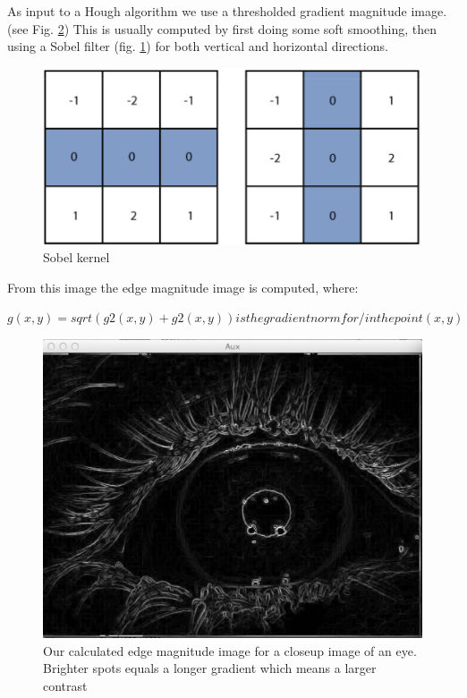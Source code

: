 As input to a Hough algorithm we use a thresholded gradient magnitude
image. (see Fig. \ref{hough3}) This is usually computed by first doing
some soft smoothing, then using a Sobel filter (fig. \ref{hough2}) for
both vertical and horizontal directions.

\begin{figure}[htbp]
\centering
\includegraphics{pics/hough/2.png}
\caption{Sobel kernel \label{hough2}}
\end{figure}

From this image the edge magnitude image is computed, where:

$g(x,y)= sqrt(g2(x,y)+g2(x,y)) is the gradient norm for/in the point (x,y)$

\begin{figure}[htbp]
\centering
\includegraphics{pics/hough/3.png}
\caption{Our calculated edge magnitude image for a closeup image of an
eye. Brighter spots equals a longer gradient which means a larger
contrast \label{hough3}}
\end{figure}

